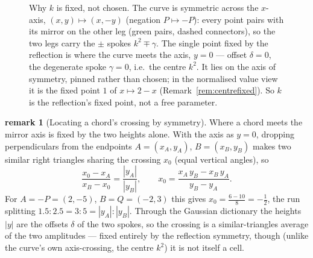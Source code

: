 \documentclass[11pt]{article}
\theoremstyle{definition}
\newtheorem{remark}{remark}
\begin{document}
\begin{figure}[htbp]
\centering
{}
\caption{Why $k$ is fixed, not chosen. The curve is symmetric across the $x$-axis,
$(x,y)\mapsto(x,-y)$ (negation $P\mapsto-P$): every point pairs with its mirror on the
other leg (green pairs, dashed connectors), so the two legs carry the $\pm$ spokes
$k^{2}\mp\gamma$. The single point fixed by the reflection is where the curve meets the
axis, $y=0$ --- offset $\delta=0$, the degenerate spoke $\gamma=0$, i.e.\ the centre
$k^{2}$. It lies on the axis of symmetry, pinned rather than chosen; in the normalised
value view it is the fixed point $1$ of $x\mapsto2-x$ (Remark~\ref{rem:centrefixed}).
So $k$ is the reflection's fixed point, not a free parameter.}
\label{fig:centrefixed}
\end{figure}

\begin{remark}[Locating a chord's crossing by symmetry]\label{rem:trig}
Where a chord meets the mirror axis is fixed by the two heights alone. With the axis
as $y=0$, dropping perpendiculars from the endpoints $A=(x_A,y_A)$, $B=(x_B,y_B)$ makes
two similar right triangles sharing the crossing $x_0$ (equal vertical angles), so
\[
  \frac{x_0-x_A}{x_B-x_0}=\frac{|y_A|}{|y_B|},
  \qquad
  x_0=\frac{x_A\,y_B-x_B\,y_A}{y_B-y_A}.
\]
For $A=-P=(2,-5)$, $B=Q=(-2,3)$ this gives $x_0=\frac{6-10}{8}=-\tfrac12$, the run
splitting $1.5:2.5=3:5=|y_A|:|y_B|$. Through the Gaussian dictionary the heights $|y|$
are the offsets $\delta$ of the two spokes, so the crossing is a similar-triangles
average of the two amplitudes --- fixed entirely by the reflection symmetry, though
(unlike the curve's own axis-crossing, the centre $k^{2}$) it is not itself a cell.
\end{remark}
\end{document}

